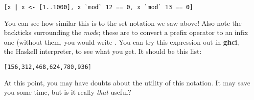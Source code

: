 \documentclass{article}
\begin{document}
\begin{verbatim}
[x | x <- [1..1000], x `mod` 12 == 0, x `mod` 13 == 0] 
\end{verbatim}

You can see how similar this is to the set notation we saw above! Also note the backticks surrounding the \textit{mod}s; these are to convert a prefix operator to an infix one (without them, you would write . You can try this expression out in \textbf{ghci}, the Haskell interpreter, to see what you get. It should be this list:

\begin{verbatim}
[156,312,468,624,780,936]
\end{verbatim}

At this point, you may have doubts about the utility of this notation. It may save you some time, but is it really \textit{that} useful?
\end{document}
